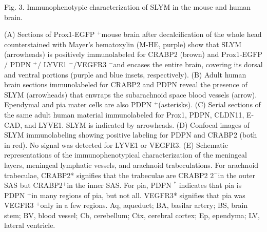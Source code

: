 Fig. 3. Immunophenotypic characterization of SLYM in the mouse and human brain.

(A) Sections of Prox1-EGFP ${ }^{+}$mouse brain after decalcification of the whole head counterstained with Mayer's hematoxylin (M-HE, purple) show that SLYM (arrowheads) is positively immunolabeled for CRABP2 (brown) and Prox1-EGFP $/$ PDPN $^{+} /$ LYVE1 $^{-}$/VEGFR3 ${ }^{-}$and encases the entire brain, covering its dorsal and ventral portions (purple and blue insets, respectively). (B) Adult human brain sections immunolabeled for CRABP2 and PDPN reveal the presence of SLYM (arrowheads) that enwraps the subarachnoid space blood vessels (arrow). Ependymal and pia mater cells are also PDPN $^{+}$(asterisks). (C) Serial sections of the same adult human material immunolabeled for Prox1, PDPN, CLDN11, E-CAD, and LYVE1. SLYM is indicated by arrowheads. (D) Confocal images of SLYM immunolabeling showing positive labeling for PDPN and CRABP2 (both in red). No signal was detected for LYVE1 or VEGFR3. (E) Schematic representations of the immunophenotypical characterization of the meningeal layers, meningeal lymphatic vessels, and arachnoid trabeculations. For arachnoid trabeculae, CRABP2* signifies that the trabeculae are CRABP2 $2^{-}$in the outer SAS but CRABP2$^{+}$in the inner SAS. For pia, PDPN $^{*}$ indicates that pia is PDPN $^{+}$in many regions of pia, but not all. VEGFR3* signifies that pia was VEGFR3 ${ }^{+}$only in a few regions. Aq, aqueduct; BA, basilar artery; BS, brain stem; BV, blood vessel; Cb, cerebellum; Ctx, cerebral cortex; Ep, ependyma; LV, lateral ventricle.
